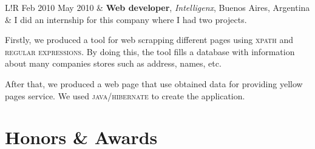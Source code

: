 \documentclass[10pt]{article}
\newcommand\VRule{\color{lightgray}\vrule width 0.5pt}
\begin{document}
\begin{tabular}{L!{\VRule}R}
Feb 2010 May 2010 & \textbf{Web developer}, \textit{Intelligenx}, Buenos Aires, Argentina\\
& \vspace{-0.7cm} I did an internship for this company where I had two projects.

Firstly, we produced a tool for web scrapping different pages using
\textsc{xpath} and \textsc{regular expressions}. By doing this, the tool fills a
database with information about many companies stores such as address, names, 
etc.

After that, we produced a web page that use obtained data for providing yellow 
pages service. We used \textsc{java/hibernate} to create the application. \\
\end{tabular}



\section*{Honors \& Awards}
\end{document}
